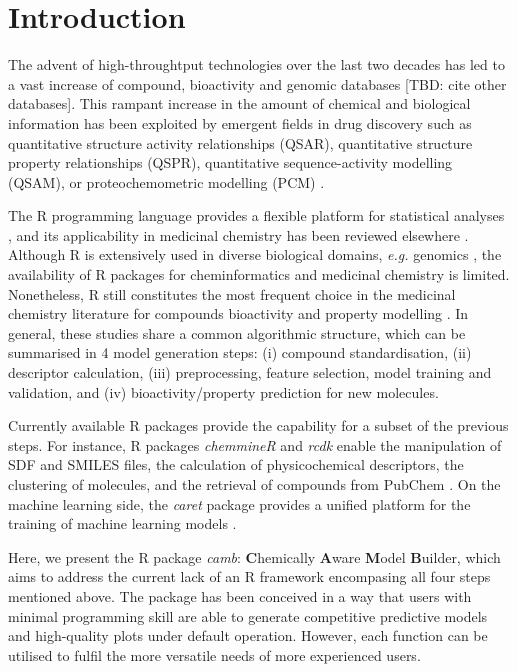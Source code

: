 \documentclass{bioinfo}
\begin{document}
\section{Introduction}

The advent of high-throughtput technologies over the last two decades 
has led to a vast increase of compound, bioactivity
and genomic databases \citep{bender_databases,chembl,pubchem} [TBD: cite other databases].
This rampant increase in the amount of chemical and biological information 
has been exploited by emergent fields in drug discovery 
such as quantitative structure activity relationships (QSAR), quantitative structure property relationships (QSPR), quantitative sequence-activity modelling (QSAM), or proteochemometric modelling (PCM) \citep{review_pcm}.

The R programming language provides a flexible platform for statistical analyses \citep{Rlanguage},
and its applicability in medicinal chemistry has been reviewed elsewhere \citep{mente}.
Although R is extensively used in diverse biological domains, {\it e.g.} genomics \citep{bioconductor},
the availability of R packages for cheminformatics and medicinal chemistry is limited. %
Nonetheless, R still constitutes the most frequent choice in the medicinal chemistry literature
for compounds bioactivity and property modelling \citep{mente}.
In general, these studies share a common algorithmic structure, which can be summarised in 4 model generation steps:
(i) compound standardisation, (ii) descriptor calculation,
(iii) preprocessing, feature selection, model training and validation, and (iv) bioactivity/property prediction for new molecules.

Currently available R packages provide the capability for a subset of the previous steps.
For instance, R packages {\it chemmineR} \citep{chemmineR} and {\it rcdk} \citep{rcdk} enable the manipulation of SDF and SMILES
files, the calculation of physicochemical descriptors, the clustering of molecules,
and the retrieval of compounds from PubChem \citep{pubchem}.
On the machine learning side, the {\it caret} package provides a
unified platform for the training of machine learning models \citep{caret}.

Here, we present the R package {\it camb}: {\bf C}hemically {\bf A}ware {\bf M}odel {\bf B}uilder,
which aims to address the current lack of an R framework encompasing all four steps mentioned above.
The package has been conceived in a way that users with minimal
programming skill are able to generate competitive predictive models and high-quality plots
under default operation.
However, each function can be utilised to fulfil the more versatile needs of more experienced users.
\end{document}
